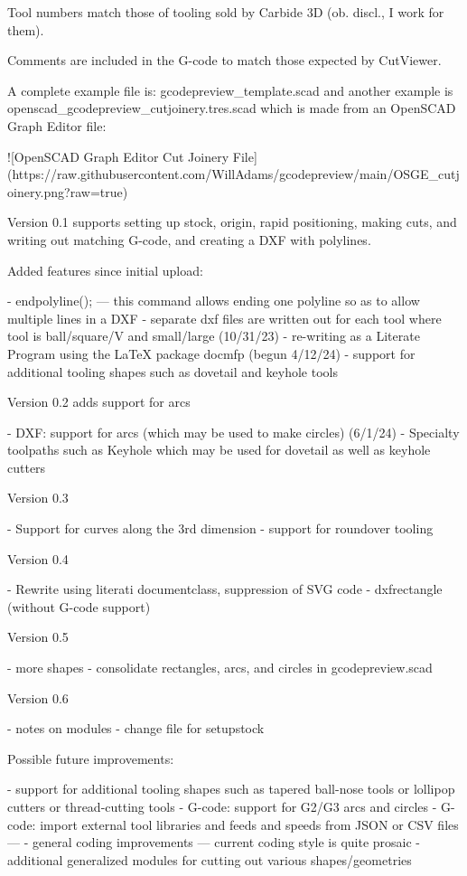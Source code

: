 \documentclass{ltxdoc}
\begin{document}
\begin{readme}
Tool numbers match those of tooling sold by Carbide 3D 
(ob. discl., I work for them). 

Comments are included in the G-code to match those 
expected by CutViewer.

A complete example file is: gcodepreview_template.scad 
and another example is openscad_gcodepreview_cutjoinery.tres.scad 
which is made from an OpenSCAD Graph Editor file:

![OpenSCAD Graph Editor Cut Joinery File](https://raw.githubusercontent.com/WillAdams/gcodepreview/main/OSGE_cutjoinery.png?raw=true)

Version 0.1 supports setting up stock, origin, rapid 
positioning, making cuts, and writing out matching 
G-code, and creating a DXF with polylines.

Added features since initial upload:

 - endpolyline(); --- this command allows ending one polyline so as to allow multiple lines in a DXF
 - separate dxf files are written out for each tool where tool is ball/square/V and small/large (10/31/23)
 - re-writing as a Literate Program using the LaTeX package docmfp (begun 4/12/24) 
 - support for additional tooling shapes such as dovetail and keyhole tools

Version 0.2 adds support for arcs 

 - DXF: support for arcs (which may be used to make circles) (6/1/24)
 - Specialty toolpaths such as Keyhole which may be used for dovetail as well as keyhole cutters

Version 0.3 

 - Support for curves along the 3rd dimension
 - support for roundover tooling
 
Version 0.4

 - Rewrite using literati documentclass, suppression of SVG code
 - dxfrectangle (without G-code support)

Version 0.5

 - more shapes
 - consolidate rectangles, arcs, and circles in gcodepreview.scad
 
Version 0.6

 - notes on modules
 - change file for setupstock

Possible future improvements:

 - support for additional tooling shapes such as tapered ball-nose tools or lollipop cutters or thread-cutting tools
 - G-code: support for G2/G3 arcs and circles
 - G-code: import external tool libraries and feeds and speeds from JSON or CSV files ---
 - general coding improvements --- current coding style is quite prosaic
 - additional generalized modules for cutting out various shapes/geometries


\end{readme}
\end{document}
